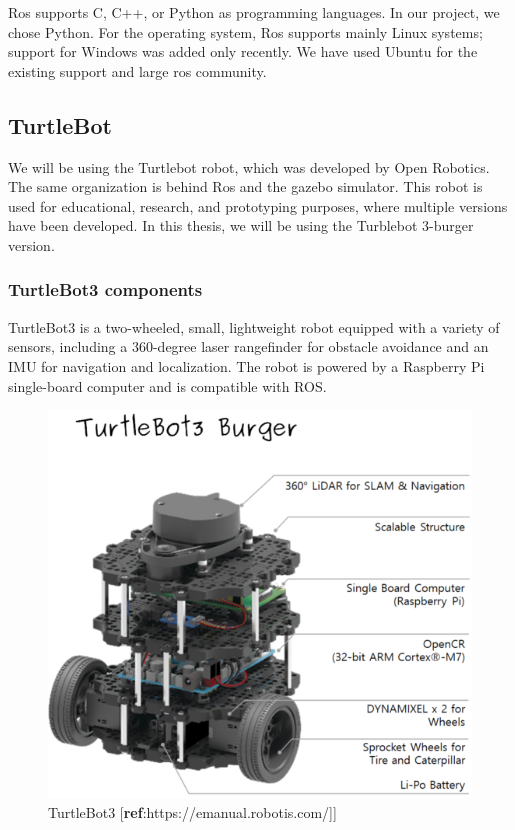 \documentclass[12pt]{extarticle}
\begin{document}
Ros supports C, C++, or Python as programming languages. In our project, we chose Python. For the operating system, Ros supports mainly Linux systems; support for Windows was added only recently. We have used Ubuntu for the existing support and large ros community.







\subsection{TurtleBot}
We will be using the Turtlebot robot, which was developed by Open Robotics. The same organization is behind Ros and the gazebo simulator.
This robot is used for educational, research, and prototyping purposes, where multiple versions have been developed. In this thesis, we will be using the Turblebot 3-burger version.\cite{turtlebot}

\subsubsection{TurtleBot3 components}
TurtleBot3 is a two-wheeled, small, lightweight robot equipped with a variety of sensors, including a 360-degree laser rangefinder for obstacle avoidance and an IMU for navigation and localization. The robot is powered by a Raspberry Pi single-board computer and is compatible with ROS.
 \begin{figure}[h]  
\centering
\includegraphics[scale=0.4]{turtlebot3_burger_components.png}
\caption[TurtleBot3]{TurtleBot3 [\textbf{ref}:https://emanual.robotis.com/]]}
\end{figure}
\end{document}
